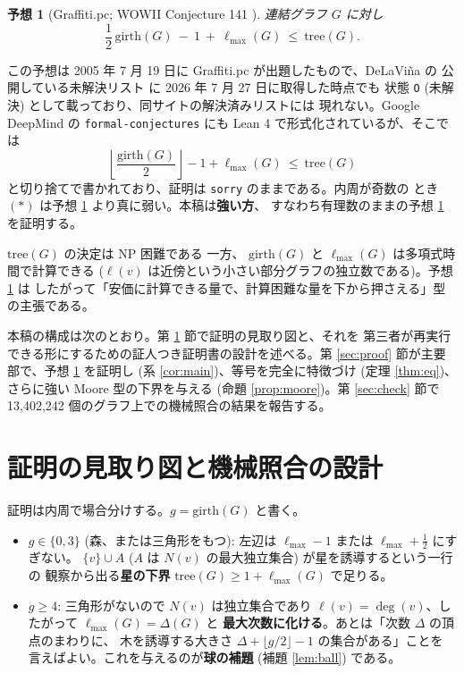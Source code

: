 \documentclass[paper=a4,fontsize=10.5pt,jafontsize=10.5pt]{jlreq}
\theoremstyle{plain}
\newtheorem{conjecture}[theorem]{予想}
\theoremstyle{definition}
\begin{document}
\begin{conjecture}[Graffiti.pc; WOWII Conjecture 141 \cite{wowii}]\label{conj:141}
連結グラフ $G$ に対し
\[ \frac{1}{2}\,\mathrm{girth}(G) \ - \ 1 \ + \ \ell_{\max}(G)
   \ \le \ \mathrm{tree}(G) . \]
\end{conjecture}

この予想は 2005 年 7 月 19 日に Graffiti.pc が出題したもので、DeLaViña の
公開している未解決リスト \cite{wowii} に 2026 年 7 月 27 日に取得した時点でも
状態 \texttt{O} (未解決) として載っており、同サイトの解決済みリストには
現れない。Google DeepMind の \texttt{formal-conjectures} \cite{formalconj} にも
Lean 4 で形式化されているが、そこでは
\[ \left\lfloor \frac{\mathrm{girth}(G)}{2} \right\rfloor - 1
   + \ell_{\max}(G) \ \le \ \mathrm{tree}(G) \tag{$\ast$} \]
と切り捨てで書かれており、証明は \texttt{sorry} のままである。内周が奇数の
とき $(\ast)$ は予想 \ref{conj:141} より真に弱い。本稿は\textbf{強い方}、
すなわち有理数のままの予想 \ref{conj:141} を証明する。

$\mathrm{tree}(G)$ の決定は NP 困難である \cite{ess1986} 一方、
$\mathrm{girth}(G)$ と $\ell_{\max}(G)$ は多項式時間で計算できる
($\ell(v)$ は近傍という小さい部分グラフの独立数である)。予想 \ref{conj:141} は
したがって「安価に計算できる量で、計算困難な量を下から押さえる」型の主張である。

本稿の構成は次のとおり。第 \ref{sec:plan} 節で証明の見取り図と、それを
第三者が再実行できる形にするための証人つき証明書の設計を述べる。第
\ref{sec:proof} 節が主要部で、予想 \ref{conj:141} を証明し (系
\ref{cor:main})、等号を完全に特徴づけ (定理 \ref{thm:eq})、さらに強い
Moore 型の下界を与える (命題 \ref{prop:moore})。第 \ref{sec:check} 節で
13,402,242 個のグラフ上での機械照合の結果を報告する。

\section{証明の見取り図と機械照合の設計}\label{sec:plan}

証明は内周で場合分けする。$g = \mathrm{girth}(G)$ と書く。

\begin{itemize}
\item $g \in \{0, 3\}$ (森、または三角形をもつ): 左辺は
  $\ell_{\max} - 1$ または $\ell_{\max} + \tfrac{1}{2}$ にすぎない。
  $\{v\} \cup A$ ($A$ は $N(v)$ の最大独立集合) が星を誘導するという一行の
  観察から出る\textbf{星の下界} $\mathrm{tree}(G) \ge 1 + \ell_{\max}(G)$
  で足りる。
\item $g \ge 4$: 三角形がないので $N(v)$ は独立集合であり
  $\ell(v) = \deg(v)$、したがって $\ell_{\max}(G) = \Delta(G)$ と
  \textbf{最大次数に化ける}。あとは「次数 $\Delta$ の頂点のまわりに、
  木を誘導する大きさ $\Delta + \lfloor g/2 \rfloor - 1$ の集合がある」ことを
  言えばよい。これを与えるのが\textbf{球の補題} (補題 \ref{lem:ball}) である。
\end{itemize}
\end{document}
